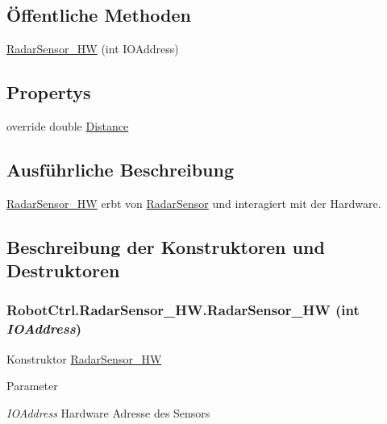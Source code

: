 \subsection*{Öffentliche Methoden}
\begin{DoxyCompactItemize}
\item 
\hyperlink{class_robot_ctrl_1_1_radar_sensor___h_w_a7730198b6097b06b30539165d3ca4953}{RadarSensor\_\-HW} (int IOAddress)
\end{DoxyCompactItemize}
\subsection*{Propertys}
\begin{DoxyCompactItemize}
\item 
override double \hyperlink{class_robot_ctrl_1_1_radar_sensor___h_w_a0eb1060a6e45bb29fdbf99e35481311e}{Distance}
\end{DoxyCompactItemize}


\subsection{Ausführliche Beschreibung}
\hyperlink{class_robot_ctrl_1_1_radar_sensor___h_w}{RadarSensor\_\-HW} erbt von \hyperlink{class_robot_ctrl_1_1_radar_sensor}{RadarSensor} und interagiert mit der Hardware. 

\subsection{Beschreibung der Konstruktoren und Destruktoren}
\hypertarget{class_robot_ctrl_1_1_radar_sensor___h_w_a7730198b6097b06b30539165d3ca4953}{
\subsubsection[{RadarSensor\_\-HW}]{\setlength{\rightskip}{0pt plus 5cm}RobotCtrl.RadarSensor\_\-HW.RadarSensor\_\-HW (int {\em IOAddress})}}
\label{class_robot_ctrl_1_1_radar_sensor___h_w_a7730198b6097b06b30539165d3ca4953}
Konstruktor \hyperlink{class_robot_ctrl_1_1_radar_sensor___h_w}{RadarSensor\_\-HW}


\begin{DoxyParams}{Parameter}
\item[{\em IOAddress}]Hardware Adresse des Sensors \end{DoxyParams}


